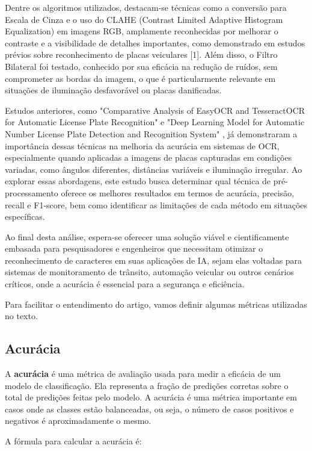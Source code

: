 \documentclass[conference]{IEEEtran}
\begin{document}
Dentre os algoritmos utilizados, destacam-se técnicas como a conversão para Escala de Cinza e o uso do CLAHE (Contrast Limited Adaptive Histogram Equalization) em imagens RGB, amplamente reconhecidas por melhorar o contraste e a visibilidade de detalhes importantes, como demonstrado em estudos prévios sobre reconhecimento de placas veiculares [1]. Além disso, o Filtro Bilateral foi testado, conhecido por sua eficácia na redução de ruídos, sem comprometer as bordas da imagem, o que é particularmente relevante em situações de iluminação desfavorável ou placas danificadas.

Estudos anteriores, como "Comparative Analysis of EasyOCR and TesseractOCR for Automatic License Plate Recognition" \cite{b1} e "Deep Learning Model for Automatic Number License Plate Detection and Recognition System" \cite{b2} , já demonstraram a importância dessas técnicas na melhoria da acurácia em sistemas de OCR, especialmente quando aplicadas a imagens de placas capturadas em condições variadas, como ângulos diferentes, distâncias variáveis e iluminação irregular. Ao explorar essas abordagens, este estudo busca determinar qual técnica de pré-processamento oferece os melhores resultados em termos de acurácia, precisão, recall e F1-score, bem como identificar as limitações de cada método em situações específicas.

Ao final desta análise, espera-se oferecer uma solução viável e cientificamente embasada para pesquisadores e engenheiros que necessitam otimizar o reconhecimento de caracteres em suas aplicações de IA, sejam elas voltadas para sistemas de monitoramento de trânsito, automação veicular ou outros cenários críticos, onde a acurácia é essencial para a segurança e eficiência.

Para facilitar o entendimento do artigo, vamos definir algumas métricas utilizadas no texto.

\subsection{Acurácia}

A \textbf{acurácia} é uma métrica de avaliação usada para medir a eficácia de um modelo de classificação. Ela representa a fração de predições corretas sobre o total de predições feitas pelo modelo. A acurácia é uma métrica importante em casos onde as classes estão balanceadas, ou seja, o número de casos positivos e negativos é aproximadamente o mesmo.

A fórmula para calcular a acurácia é:
\end{document}
